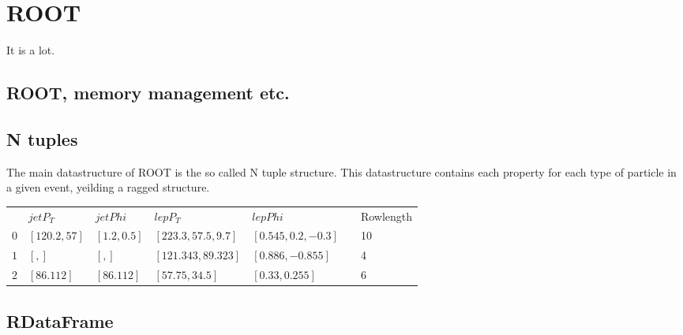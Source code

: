 \section*{ROOT}

It is a lot. \cite{ROOT}
\subsection*{ROOT, memory management etc.}


\subsection*{N tuples}

The main datastructure of ROOT is the so called N tuple structure. This datastructure contains each property for each type of particle in a given event, yeilding
a ragged structure. 

\begin{table}[]
    \begin{tabular}{|l|l|l|l|l|l|l|}
    \cline{1-5} \cline{7-7}
        & $jetP_T$      & $jetPhi$     & $lepP_T$             & $lepPhi$             &  & Rowlength \\ \cline{1-5} \cline{7-7} 
    $0$ & $[120.2, 57]$ & $[1.2, 0.5]$ & $[223.3, 57.5, 9.7]$ & $[0.545, 0.2, -0.3]$ &  & 10        \\ \cline{1-5} \cline{7-7} 
    $1$ & $[, ]$          & $[, ]$         & $[121.343, 89.323]$  & $[0.886, -0.855]$    &  & 4         \\ \cline{1-5} \cline{7-7} 
    $2$ & $[86.112]$    & $[86.112]$   & $[57.75, 34.5]$      & $[0.33, 0.255]$      &  & 6         \\ \cline{1-5} \cline{7-7} 
    \end{tabular}
\end{table}

\subsection*{RDataFrame}

\cite{Manca:2694107}

